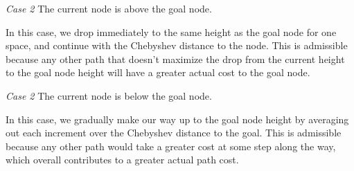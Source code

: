 \documentclass[12pt,letterpaper]{article}
\begin{document}
\begin{enumerate}
      \textit{Case 2} The current node is above the goal node.

      In this case, we drop immediately to the same height as the goal node for one space, and continue with the Chebyshev distance to the node.  This is admissible because any other path that doesn't maximize the drop from the current height to the goal node height will have a greater actual cost to the goal node.

      \textit{Case 2} The current node is below the goal node.

      In this case, we gradually make our way up to the goal node height by averaging out each increment over the Chebyshev distance to the goal. This is admissible because any other path would take a greater cost at some step along the way, which overall contributes to a greater actual path cost.

  \end{enumerate}
\end{document}

